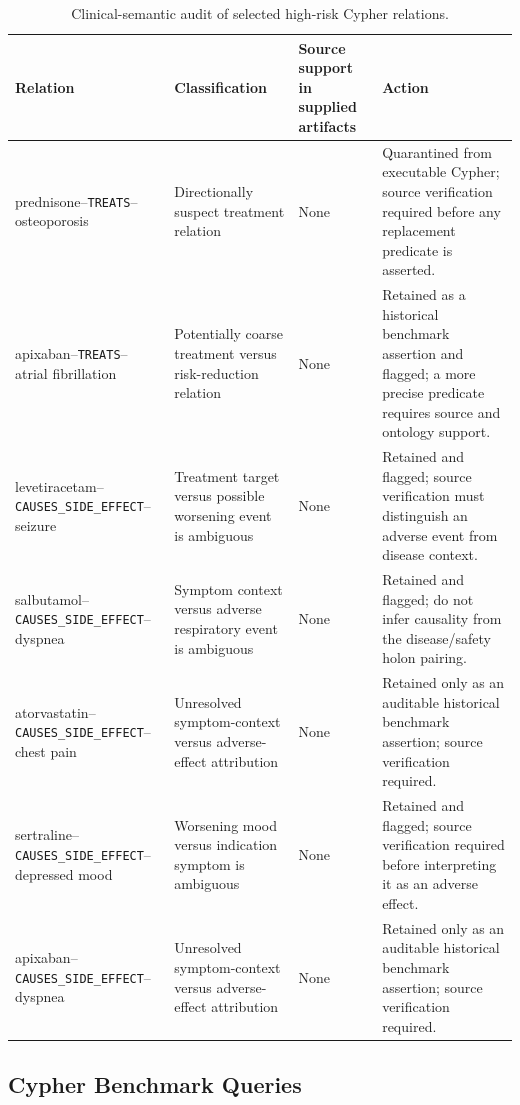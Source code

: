 \documentclass[10pt,a4paper]{article}
\newcommand{\artifact}[2]{%
  }
\begin{document}
\begin{table}[H]
\centering
\caption{Clinical-semantic audit of selected high-risk Cypher relations.}
\label{tab:clinical_relation_audit}
\small
\begin{tabularx}{\textwidth}{@{}p{}p{}p{}X@{}}
\toprule
\textbf{Relation} & \textbf{Classification} & \textbf{Source support in supplied artifacts} & \textbf{Action} \\
\midrule
prednisone--\texttt{TREATS}--osteoporosis & Directionally suspect treatment relation & None & Quarantined from executable Cypher; source verification required before any replacement predicate is asserted. \\
apixaban--\texttt{TREATS}--atrial fibrillation & Potentially coarse treatment versus risk-reduction relation & None & Retained as a historical benchmark assertion and flagged; a more precise predicate requires source and ontology support. \\
levetiracetam--\texttt{CAUSES\_SIDE\_EFFECT}--seizure & Treatment target versus possible worsening event is ambiguous & None & Retained and flagged; source verification must distinguish an adverse event from disease context. \\
salbutamol--\texttt{CAUSES\_SIDE\_EFFECT}--dyspnea & Symptom context versus adverse respiratory event is ambiguous & None & Retained and flagged; do not infer causality from the disease/safety holon pairing. \\
atorvastatin--\texttt{CAUSES\_SIDE\_EFFECT}--chest pain & Unresolved symptom-context versus adverse-effect attribution & None & Retained only as an auditable historical benchmark assertion; source verification required. \\
sertraline--\texttt{CAUSES\_SIDE\_EFFECT}--depressed mood & Worsening mood versus indication symptom is ambiguous & None & Retained and flagged; source verification required before interpreting it as an adverse effect. \\
apixaban--\texttt{CAUSES\_SIDE\_EFFECT}--dyspnea & Unresolved symptom-context versus adverse-effect attribution & None & Retained only as an auditable historical benchmark assertion; source verification required. \\
\bottomrule
\end{tabularx}
\end{table}

\subsection{Cypher Benchmark Queries}
\artifact{cypher/benchmark_queries.cypher}{Cypher equivalents of benchmark queries.}
\end{document}
